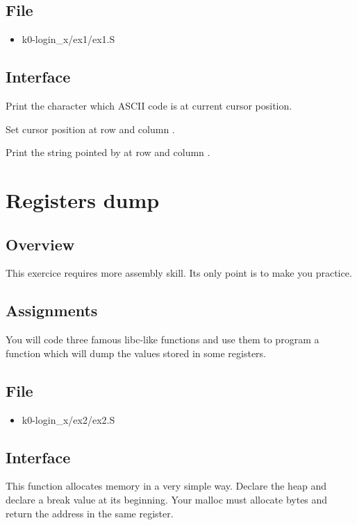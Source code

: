 \subsection*{File}
\begin{itemize}
  \item k0-login\_x/ex1/ex1.S
\end{itemize}

\subsection*{Interface}
{
  Print the character which ASCII code is  at current cursor
  position.
}

{
  Set cursor position at row  and column .
}

{
  Print the string pointed by  at row  and
  column .
}

%
%

\newpage

\section{Registers dump}

\subsection*{Overview}
This exercice requires more assembly skill. Its only point is to make you
practice.

\subsection*{Assignments}
You will code three famous libc-like functions and use them to program
a function which will dump the values stored in some registers.

\subsection*{File}
\begin{itemize}
  \item k0-login\_x/ex2/ex2.S
\end{itemize}

\subsection*{Interface}
{
  This function allocates memory in a very simple way. Declare the heap and
  declare a break value at its beginning.
  Your malloc must allocate  bytes and return the address
  in the same register.
}

